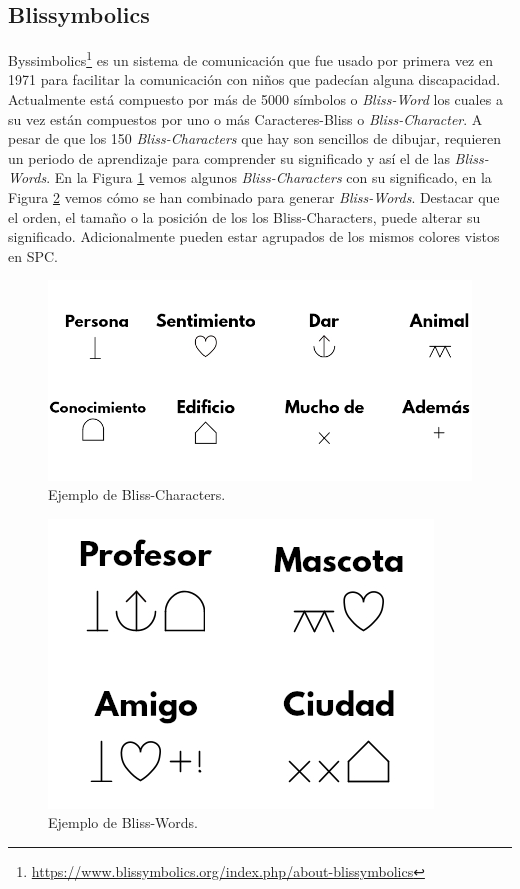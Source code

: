 \subsection{Blissymbolics}
Byssimbolics\footnote{\url{https://www.blissymbolics.org/index.php/about-blissymbolics}}
es un sistema de comunicación que fue usado por primera vez en 1971 para facilitar la comunicación con niños que padecían alguna discapacidad. Actualmente está compuesto por más de 5000 símbolos o  \textit{Bliss-Word} los cuales a su vez están compuestos por uno o más Caracteres-Bliss o  \textit{Bliss-Character}. A pesar de que los 150 \textit{Bliss-Characters} que hay son sencillos de dibujar, requieren un periodo de aprendizaje para comprender su significado y así el de las \textit{Bliss-Words}. En la Figura \ref{fig:blisscharacters} vemos algunos \textit{Bliss-Characters} con su significado, en la Figura \ref{fig:blissword} vemos cómo se han combinado para generar \textit{Bliss-Words}. Destacar que el orden, el tamaño o la posición de los los Bliss-Characters, puede alterar su significado. Adicionalmente pueden estar agrupados de los mismos colores vistos en SPC.


\begin{figure}[h!]
	\centering
	\includegraphics[width=0.8\linewidth]{Imagenes/Bitmap/BlissCharacters}
	\caption[Ejemplo de Bliss-Characters]{Ejemplo de Bliss-Characters.}
	\label{fig:blisscharacters}
\end{figure}

\begin{figure}[h!]
	\centering
	\includegraphics[width=0.4\linewidth]{Imagenes/Bitmap/BlissWord}
	\caption[Ejemplo de Bliss-Words]{Ejemplo de Bliss-Words.}
	\label{fig:blissword}
\end{figure}



